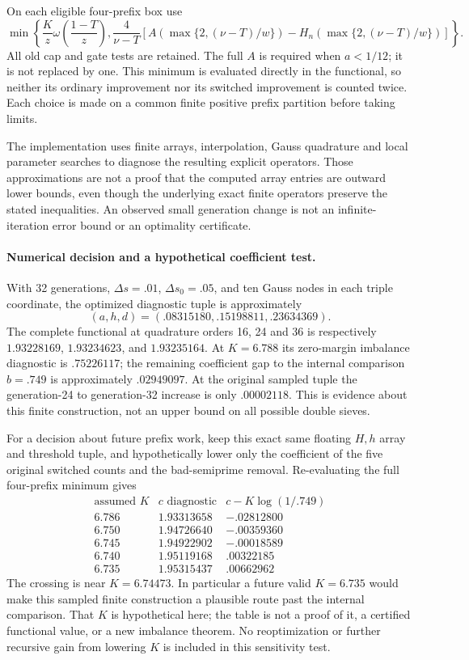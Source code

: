 On each eligible four-prefix box use
\[
 \min\left\{\frac Kz\omega\left(\frac{1-T}{z}\right),
             \frac4{\nu-T}
               \left[A\left(\max\{2,(\nu-T)/w\}\right)
                     -H_n\left(\max\{2,(\nu-T)/w\}\right)\right]
       \right\}.
\]
All old cap and gate tests are retained. The full $A$ is required
when $a<1/12$; it is not replaced by one. This minimum is evaluated
directly in the functional, so neither its ordinary improvement nor
its switched improvement is counted twice. Each choice is made on
a common finite positive prefix partition before taking limits.

The implementation uses finite arrays, interpolation, Gauss
quadrature and local parameter searches to diagnose the resulting
explicit operators. Those approximations are not a proof that the
computed array entries are outward lower bounds, even though the
underlying exact finite operators preserve the stated inequalities.
An observed small generation change is not an infinite-iteration
error bound or an optimality certificate.

\paragraph{Numerical decision and a hypothetical coefficient test.}
With 32 generations, $\Delta s=.01$, $\Delta s_0=.05$, and ten
Gauss nodes in each triple coordinate, the optimized diagnostic tuple
is approximately
\[
 (a,h,d)=(.08315180,.15198811,.23634369).
\]
The complete functional at quadrature orders 16, 24 and 36 is
respectively $1.93228169$, $1.93234623$, and $1.93235164$.
At $K=6.788$ its zero-margin imbalance diagnostic is $.75226117$;
the remaining coefficient gap to the internal comparison $b=.749$
is approximately $.02949097$. At the original sampled tuple the
generation-24 to generation-32 increase is only $.00002118$.
This is evidence about this finite construction, not an upper bound
on all possible double sieves.

For a decision about future prefix work, keep this exact same
floating $H,h$ array and threshold tuple, and hypothetically lower
only the coefficient of the five original switched counts and the
bad-semiprime removal. Re-evaluating the full four-prefix minimum
gives
\[
\begin{array}{c|c|c}
 \text{assumed }K&c\text{ diagnostic}&c-K\log(1/.749)\\\hline
 6.786&1.93313658&-.02812800\\
 6.750&1.94726640&-.00359360\\
 6.745&1.94922902&-.00018589\\
 6.740&1.95119168& .00322185\\
 6.735&1.95315437& .00662962
\end{array}
\]
The crossing is near $K=6.74473$. In particular a future valid
$K=6.735$ would make this sampled finite construction a plausible
route past the internal comparison. That $K$ is hypothetical here;
the table is not a proof of it, a certified functional value, or a
new imbalance theorem. No reoptimization or further recursive gain
from lowering $K$ is included in this sensitivity test.
